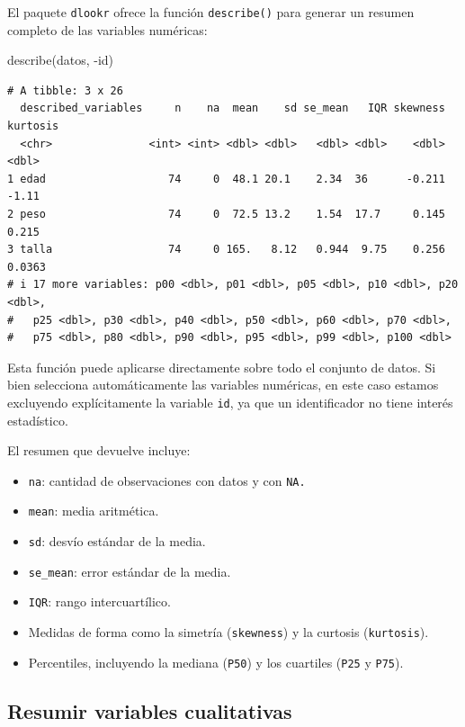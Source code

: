 \documentclass[
  spanish,
  a4paper,
]{scrbook}
\newenvironment{Shaded}{\begin{snugshade}}{\end{snugshade}}
\newcommand{\FunctionTok}[1]{\textcolor[rgb]{0.28,0.35,0.67}{#1}}
\newcommand{\NormalTok}[1]{\textcolor[rgb]{0.00,0.23,0.31}{#1}}
\newcommand{\SpecialCharTok}[1]{\textcolor[rgb]{0.37,0.37,0.37}{#1}}
\begin{document}
El paquete \texttt{dlookr} ofrece la función \texttt{describe()} para
generar un resumen completo de las variables numéricas:

\begin{Shaded}
\begin{Highlighting}[]
\FunctionTok{describe}\NormalTok{(datos, }\SpecialCharTok{{-}}\NormalTok{id)}
\end{Highlighting}
\end{Shaded}

\begin{verbatim}
# A tibble: 3 x 26
  described_variables     n    na  mean    sd se_mean   IQR skewness kurtosis
  <chr>               <int> <int> <dbl> <dbl>   <dbl> <dbl>    <dbl>    <dbl>
1 edad                   74     0  48.1 20.1    2.34  36      -0.211  -1.11  
2 peso                   74     0  72.5 13.2    1.54  17.7     0.145   0.215 
3 talla                  74     0 165.   8.12   0.944  9.75    0.256   0.0363
# i 17 more variables: p00 <dbl>, p01 <dbl>, p05 <dbl>, p10 <dbl>, p20 <dbl>,
#   p25 <dbl>, p30 <dbl>, p40 <dbl>, p50 <dbl>, p60 <dbl>, p70 <dbl>,
#   p75 <dbl>, p80 <dbl>, p90 <dbl>, p95 <dbl>, p99 <dbl>, p100 <dbl>
\end{verbatim}

Esta función puede aplicarse directamente sobre todo el conjunto de
datos. Si bien selecciona automáticamente las variables numéricas, en
este caso estamos excluyendo explícitamente la variable \texttt{id}, ya
que un identificador no tiene interés estadístico.

El resumen que devuelve incluye:

\begin{itemize}
\item
  \texttt{na}: cantidad de observaciones con datos y con \texttt{NA.}
\item
  \texttt{mean}: media aritmética.
\item
  \texttt{sd}: desvío estándar de la media.
\item
  \texttt{se\_mean}: error estándar de la media.
\item
  \texttt{IQR}: rango intercuartílico.
\item
  Medidas de forma como la simetría (\texttt{skewness}) y la curtosis
  (\texttt{kurtosis}).
\item
  Percentiles, incluyendo la mediana (\texttt{P50}) y los cuartiles
  (\texttt{P25} y \texttt{P75}).
\end{itemize}

\subsection{Resumir variables
cualitativas}\label{resumir-variables-cualitativas}
\end{document}
